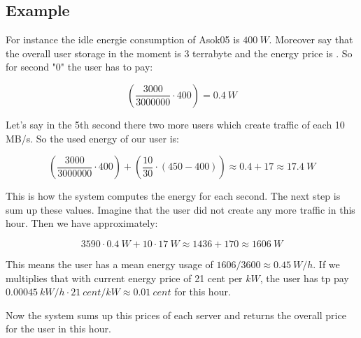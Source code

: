   \subsection{Example}
     For instance the idle energie consumption of Asok05 is $400\ W$. Moreover say that the overall user storage in the moment is 3 terrabyte and the energy price is . So for second "0" the user has to pay:
    
    $$(\frac{3000}{3000000} \cdot 400) = 0.4\ W $$
    
    Let's say in the 5th second there two more users which create traffic of each 10 MB/s. So the used energy of our user is:
    
     $$(\frac{3000}{3000000} \cdot 400) + (\frac{10}{30} \cdot (450 - 400))  \approx 0.4 + 17 \approx 17.4\ W $$
           
  	This is how the system computes the energy for each second. The next step is sum up these values. Imagine that the user did not create any more traffic in this hour. Then we have approximately:
  	
  	$$ 3590 \cdot 0.4\ W + 10 \cdot 17\ W \approx 1436 + 170 \approx 1606\ W$$
  	
  	This means the user has a mean energy usage of $1606 / 3600 \approx 0.45\ W/h$. If we multiplies that with current energy price of 21 cent per $kW$, the user has tp pay $ 0.00045\ kW/h \cdot 21\ cent/kW \approx 0.01\ cent$ for this hour.
  	
  	Now the system sums up this prices of each server and returns the overall price for the user in this hour.  